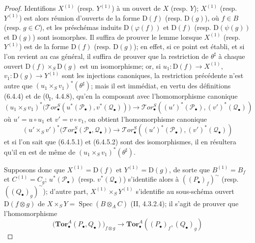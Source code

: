 \begin{proof}
Identifions $X^{(1)}$ (resp. $Y^{(1)}$) à un ouvert de $X$ (resp. $Y$);
$X^{(1)}$ (resp. $Y^{(1)}$) est alors réunion d'ouverts de la forme
$\mathrm D(f)$ (resp. $\mathrm D(g)$), où $f\in B$ (resp. $g\in C$), et les
préschémas induits $\mathrm D(\varphi(f))$ et $\mathrm D(f)$ (resp.
$\mathrm D(\psi(g))$ et $\mathrm D(g)$) sont isomorphes. Il suffira de prouver
le lemme lorsque $X^{(1)}$ (resp. $Y^{(1)}$) est de la forme $\mathrm D(f)$
(resp. $\mathrm D(g)$); en effet, si ce point est établi, et si l'on revient au
cas général, il suffira de prouver que la restriction de $\theta^\sharp$ à
chaque ouvert $\mathrm D(f)\times_S\mathrm D(g)$ est un isomorphisme; or, si
$u_1:\mathrm D(f)\to X^{(1)}$, $v_1:\mathrm D(g)\to Y^{(1)}$ sont les
injections canoniques, la restriction précédente n'est autre que
$(u_1\times_S v_1)^*(\theta^\sharp)$; mais il est immédiat, en vertu des
définitions (6.4.4) et de ($0_{\mathrm I}$, 4.4.8), qu'en la composant avec
l'homomorphisme canonique
\[
  (u_1\times_S v_1)^*
  \bigl(\mathscr{T}\!or_\bullet^S
    (u^*(\mathscr P_\bullet),v^*(\mathscr Q_\bullet))\bigr)
  \longrightarrow
  \mathscr{T}\!or_\bullet^S
  ((u')^*(\mathscr P_\bullet),(v')^*(\mathscr Q_\bullet))
  \tag{6.4.5.1}\label{III.6.4.5.1.fr}
\]
où $u'=u\circ u_1$ et $v'=v\circ v_1$, on obtient l'homomorphisme canonique
\[
  (u'\times_S v')^*
  \bigl(\mathscr{T}\!or_\bullet^S(\mathscr P_\bullet,\mathscr Q_\bullet)\bigr)
  \longrightarrow
  \mathscr{T}\!or_\bullet^S
  ((u')^*(\mathscr P_\bullet),(v')^*(\mathscr Q_\bullet))
  \tag{6.4.5.2}\label{III.6.4.5.2.fr}
\]
et si l'on sait que (6.4.5.1) et (6.4.5.2) sont des isomorphismes, il en
résultera qu'il en est de même de $(u_1\times_S v_1)^*(\theta^\sharp)$.

Supposons donc que $X^{(1)}=\mathrm D(f)$ et $Y^{(1)}=\mathrm D(g)$, de sorte
que $B^{(1)}=B_f$ et $C^{(1)}=C_g$; $u^*(\mathscr P_\bullet)$ (resp.
$v^*(\mathscr Q_\bullet)$) s'identifie alors à
$((P_\bullet)_f)^{\sim}$ (resp. $((Q_\bullet)_g)^{\sim}$); d'autre part,
$X^{(1)}\times_S Y^{(1)}$ s'identifie au sous-schéma ouvert
$\mathrm D(f\otimes g)$ de
$X\times_S Y=\operatorname{Spec}(B\otimes_A C)$ (II, 4.3.2.4); il s'agit de
prouver que l'homomorphisme
\[
  \bigl(\mathbf{Tor}_\bullet^A(P_\bullet,Q_\bullet)\bigr)_{f\otimes g}
  \longrightarrow
  \mathbf{Tor}_\bullet^A((P_\bullet)_f,(Q_\bullet)_g)
  \tag{6.4.5.3}\label{III.6.4.5.3.fr}
\]


\end{proof}
